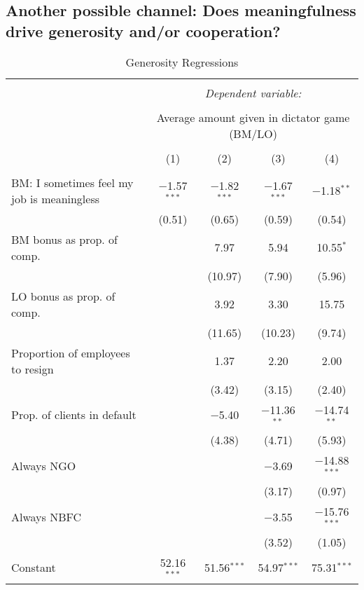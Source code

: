 \documentclass[11pt]{article}
\begin{document}
\pagebreak

\subsection{Another possible channel: Does meaningfulness drive generosity and/or cooperation?}

\begin{table}[!htbp] \centering 
  \caption{Generosity Regressions} 
  \label{} 
\footnotesize 
\begin{tabular}{@{\extracolsep{5pt}}lcccc} 
\\[-1.8ex]\hline 
\hline \\[-1.8ex] 
 & \multicolumn{4}{c}{\textit{Dependent variable:}} \\ 
\cline{2-5} 
\\[-1.8ex] & \multicolumn{4}{c}{Average amount given in dictator game (BM/LO)} \\ 
\\[-1.8ex] & (1) & (2) & (3) & (4)\\ 
\hline \\[-1.8ex] 
 BM: I sometimes feel my job is meaningless & $-$1.57$^{***}$ & $-$1.82$^{***}$ & $-$1.67$^{***}$ & $-$1.18$^{**}$ \\ 
  & (0.51) & (0.65) & (0.59) & (0.54) \\ 
  BM bonus as prop. of comp. &  & 7.97 & 5.94 & 10.55$^{*}$ \\ 
  &  & (10.97) & (7.90) & (5.96) \\ 
  LO bonus as prop. of comp. &  & 3.92 & 3.30 & 15.75 \\ 
  &  & (11.65) & (10.23) & (9.74) \\ 
  Proportion of employees to resign &  & 1.37 & 2.20 & 2.00 \\ 
  &  & (3.42) & (3.15) & (2.40) \\ 
  Prop. of clients in default &  & $-$5.40 & $-$11.36$^{**}$ & $-$14.74$^{**}$ \\ 
  &  & (4.38) & (4.71) & (5.93) \\ 
  Always NGO &  &  & $-$3.69 & $-$14.88$^{***}$ \\ 
  &  &  & (3.17) & (0.97) \\ 
  Always NBFC &  &  & $-$3.55 & $-$15.76$^{***}$ \\ 
  &  &  & (3.52) & (1.05) \\ 
  Constant & 52.16$^{***}$ & 51.56$^{***}$ & 54.97$^{***}$ & 75.31$^{***}$ \\ 

\end{tabular}
\end{table}
\end{document}
